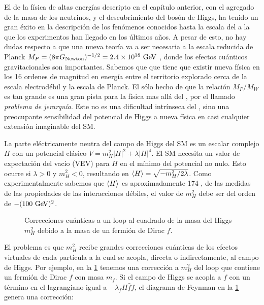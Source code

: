 El {\SM} de la física de altas energías descripto en el capítulo
anterior, con el agregado de la masa de los neutrinos, y el
descubrimiento del bosón de Higgs, ha tenido un gran éxito en la
descripción de los fenómenos conocidos hasta la escala del {\tev} a la
que los experimentos han llegado en los últimos a\~nos.
A pesar de esto, no hay dudas respecto a que una nueva teoría va a ser
necesaria a la escala reducida de Planck  $M_P = (8\pi
G_\text{Newton})^{-1/2} = 2.4 \times 10^{18} \gev$ , donde los efectos
cuánticos gravitacionales son importantes. Sabemos que que tiene que
existir nueva física en los 16 ordenes de magnitud en energía entre el
territorio explorado cerca de la escala electrodébil y la escala de
Planck. El sólo hecho de que la relación $M_P/M_W$ es tan grande es
una gran pista para la física mas allá del {\SM}, por el llamado
\emph{problema de jerarquía}. Este no es una dificultad intrínseca del
     {\SM}, sino una preocupante sensibilidad del potencial de Higgs a
     nueva física en casi cualquier extensión imaginable del SM.

La parte eléctricamente neutra del campo de Higgs del SM es un escalar
complejo $H$ con un potencial clásico $V=m_H^2 |H|^2 + \lambda|H|^4$.
El SM necesita un valor de expectación del vacío (VEV) para $H$ en el
mínimo del potencial no nulo. Esto ocurre si $\lambda>0$ y $m_H^2<0$,
resultando en $\langle H \rangle = \sqrt{-m_H^2/2\lambda}$. Como
experimentalmente sabemos que $\langle H \rangle$ es aproximadamente 174 \gev,
de las medidas de las propiedades de las interacciones débiles, el
valor de $m_H^2$ debe ser del orden de $-(100 \gev)^2$.

\begin{figure}[!htbp]
  \centering 
  \caption{Correcciones cu\'anticas a un loop al cuadrado de la masa
    del Higgs $m_H^2$ debido a la masa de un fermión de Dirac $f$.}
  \label{fig:higgs_correction_f}
\end{figure}

El problema es que $m_H^2$ recibe grandes correcciones cuánticas de
los efectos virtuales de cada partícula a la cual se acopla, directa o
indirectamente, al campo de Higgs. Por ejemplo, en la
\cref{fig:higgs_correction_f} tenemos una corrección a $m_H^2$ del
loop que contiene un fermión de Dirac $f$ con masa $m_f$. Si el campo
de Higgs se acopla a $f$ con un término en el lagrangiano igual a
$-\lambda_f H \bar{f}f$, el diagrama de Feynman en la
\cref{fig:higgs_correction_f} genera una corrección:

